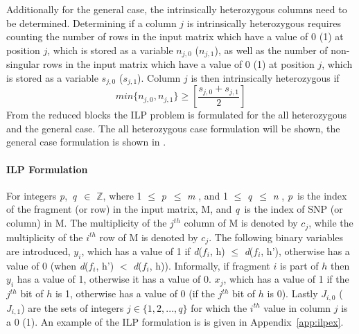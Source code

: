 \documentclass[10pt,twocolumn]{article}
\newcommand{\M}{\textit{m }}
\newcommand{\N}{\textit{n }}
\newcommand{\D}{\textit{d}}
\newcommand{\PP}{\textit{p}}
\newcommand{\QQ}{\textit{q}}
\begin{document}
Additionally for the general case, the intrinsically heterozygous columns need to be determined. 
Determining if a column $j$ is intrinsically heterozygous requires counting the number of rows in the input matrix which
have a value of 0 (1) at position $j$, which is stored as a variable $n_{j,0}$ ($n_{j,1}$), as well as the
number of non-singular rows in the input matrix which have a value of 0 (1) at position $j$, which is stored
as a variable $s_{j,0}$ ($s_{j,1}$). Column $j$ is then intrinsically heterozygous if
\begin{equation*}
    min\{n_{j,0},n_{j,1}\} \ge \left[ \frac{s_{j,0} + s_{j,1}}{2} \right]
\end{equation*}
From the reduced blocks the ILP problem is formulated for the all heterozygous and the general case. The
all heterozygous case formulation will be shown, the general case formulation is shown in \cite{sup:2013}. 

\paragraph{ILP Formulation} \label{ssec:ilpform}

For integers \PP,\ \QQ\ $\in$ $\mathbb{Z}$, where 1 $\le$ \PP\ $\le$ \M, and 1 $\le$ \QQ\ $\le$ \N, \PP\ is the 
index of the fragment (or row) in the input matrix, M, and \QQ\ is the index of SNP (or column) in M. 
The multiplicity of the $j^{th}$ column of M is denoted by $c_j$, while the multiplicity of the
$i^{th}$ row of M is denoted by $c_j$. The following 
binary variables are introduced, $y_i$, which has a value of 1 if \D($f_i$, h) $\le$ \D($f_i$, h'), otherwise 
has a value of 0 (when \D($f_i$, h') $<$ \D($f_i$, h)). Informally, if fragment $i$ is part of $h$ then $y_i$ 
has a value of 1, otherwise it has a value of 0. $x_j$, which has a value of 1 if the $j^{th}$ bit of 
$h$ is 1, otherwise has a value of 0 (if the $j^{th}$ bit of $h$ is 0). 
Lastly $J_{i,0}$ ($J_{i,1}$) are the sets of integers $j \in \{1,2,...,q\}$ for which 
the $i^{th}$ value in column $j$ is a 0 (1). An example of the ILP formulation is is given in 
Appendix~\ref{app:ilpex}.
\end{document}
